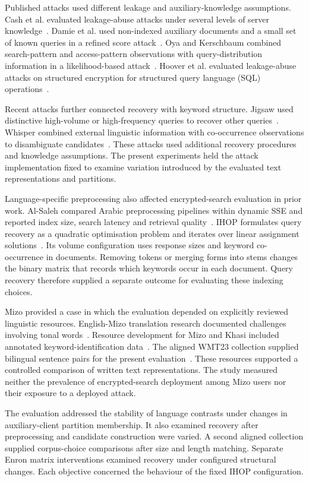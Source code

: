 \documentclass[12pt]{article}
\begin{document}
Published attacks used different leakage and auxiliary-knowledge assumptions. Cash et al. evaluated leakage-abuse attacks under several levels of server knowledge~\cite{cash}. Damie et al. used non-indexed auxiliary documents and a small set of known queries in a refined score attack~\cite{damie}. Oya and Kerschbaum combined search-pattern and access-pattern observations with query-distribution information in a likelihood-based attack~\cite{sap}. Hoover et al. evaluated leakage-abuse attacks on structured encryption for structured query language (SQL) operations~\cite{hoover}.

Recent attacks further connected recovery with keyword structure. Jigsaw used distinctive high-volume or high-frequency queries to recover other queries~\cite{jigsaw}. Whisper combined external linguistic information with co-occurrence observations to disambiguate candidates~\cite{whisper}. These attacks used additional recovery procedures and knowledge assumptions. The present experiments held the attack implementation fixed to examine variation introduced by the evaluated text representations and partitions.

Language-specific preprocessing also affected encrypted-search evaluation in prior work. Al-Saleh compared Arabic preprocessing pipelines within dynamic SSE and reported index size, search latency and retrieval quality~\cite{arabic}. IHOP formulates query recovery as a quadratic optimisation problem and iterates over linear assignment solutions~\cite{ihop}. Its volume configuration uses response sizes and keyword co-occurrence in documents. Removing tokens or merging forms into stems changes the binary matrix that records which keywords occur in each document. Query recovery therefore supplied a separate outcome for evaluating these indexing choices.

Mizo provided a case in which the evaluation depended on explicitly reviewed linguistic resources. English-Mizo translation research documented challenges involving tonal words~\cite{mizotone}. Resource development for Mizo and Khasi included annotated keyword-identification data~\cite{mizoresources}. The aligned WMT23 collection supplied bilingual sentence pairs for the present evaluation~\cite{indic}. These resources supported a controlled comparison of written text representations. The study measured neither the prevalence of encrypted-search deployment among Mizo users nor their exposure to a deployed attack.

The evaluation addressed the stability of language contrasts under changes in auxiliary-client partition membership. It also examined recovery after preprocessing and candidate construction were varied. A second aligned collection supplied corpus-choice comparisons after size and length matching. Separate Enron matrix interventions examined recovery under configured structural changes. Each objective concerned the behaviour of the fixed IHOP configuration.
\end{document}
